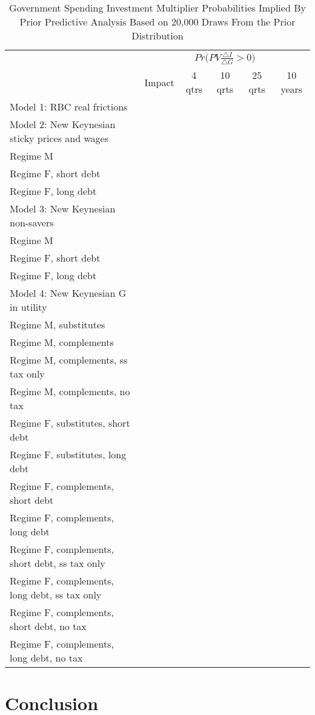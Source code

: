 \documentclass[letterpaper,12pt]{article}%
\begin{document}
\begin{table}[H]
    \centering
    \caption{Government Spending Investment Multiplier Probabilities Implied By Prior Predictive Analysis Based on 20,000 Draws From the Prior Distribution}
    \begin{tabular}{l c c c c c}
    \toprule
        & \multicolumn{5}{c}{$Pr\Big(PV \frac{\triangle I}{\triangle G}>0\Big)$}\\
        \cmidrule{2-6}
        & Impact & 4 qtrs & 10 qrts & 25 qrts & 10 years \\
        \midrule
     Model 1: RBC real frictions &    &   &   &   &  \\
     Model 2: New Keynesian sticky prices and wages    &    &   &   &   &  \\
     \quad Regime M &    &   &   &   &  \\
     \quad Regime F, short debt &    &   &   &   &  \\
     \quad Regime F, long debt &    &   &   &   &  \\
     Model 3: New Keynesian non-savers &    &   &   &   &  \\
     \quad Regime M &    &   &   &   &  \\
     \quad Regime F, short debt &    &   &   &   &  \\
     \quad Regime F, long debt &    &   &   &   &  \\
     Model 4: New Keynesian G in utility &    &   &   &   &  \\
     \quad Regime M, substitutes &    &   &   &   &  \\
     \quad Regime M, complements &    &   &   &   &  \\
     \quad Regime M, complements, ss tax only &    &   &   &   &  \\
     \quad Regime M, complements, no tax &    &   &   &   &  \\
     \quad Regime F, substitutes, short debt &    &   &   &   &  \\
     \quad Regime F, substitutes, long debt &    &   &   &   &  \\
     \quad Regime F, complements, short debt &    &   &   &   &  \\
     \quad Regime F, complements, long debt &    &   &   &   &  \\
     \quad Regime F, complements, short debt, ss tax only &    &   &   &   &  \\
     \quad Regime F, complements, long debt, ss tax only &    &   &   &   &  \\
     \quad Regime F, complements, short debt, no tax &    &   &   &   &  \\
     \quad Regime F, complements, long debt, no tax &    &   &   &   &  \\
    \bottomrule    
    \end{tabular}
    \label{tab:my_label}
\end{table}


\section{Conclusion}
\end{document}

